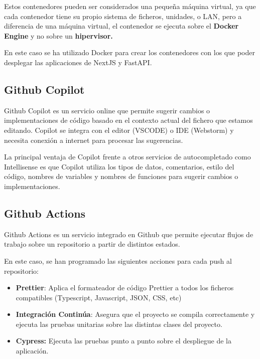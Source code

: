 Estos contenedores pueden ser considerados una pequeña máquina virtual,
ya que cada contenedor tiene su propio sistema de ficheros, unidades, o
LAN, pero a diferencia de una máquina virtual, el contenedor se ejecuta
sobre el \textbf{Docker Engine} y no sobre un \textbf{hipervisor.}

En este caso se ha utilizado Docker para crear los contenedores con los
que poder desplegar las aplicaciones de NextJS y FastAPI.

\hypertarget{github-copilot}{%
\subsection{Github Copilot}\label{github-copilot}}

Github Copilot es un servicio online que permite sugerir cambios o
implementaciones de código basado en el contexto actual del fichero que
estamos editando. Copilot se integra con el editor (VSCODE) o IDE
(Webstorm) y necesita conexión a internet para procesar las sugerencias.

La principal ventaja de Copilot frente a otros servicios de
autocompletado como Intellisense es que Copilot utiliza los tipos de
datos, comentarios, estilo del código, nombres de variables y nombres de
funciones para sugerir cambios o implementaciones.

\hypertarget{github-actions}{%
\subsection{Github Actions}\label{github-actions}}

Github Actions es un servicio integrado en Github que permite ejecutar
flujos de trabajo sobre un repositorio a partir de distintos estados.

En este caso, se han programado las siguientes acciones para cada push
al repositorio:

\begin{itemize}
\itemsep0em 
\item
  \textbf{Prettier}: Aplica el formateador de código Prettier a todos
  los ficheros compatibles (Typescript, Javascript, JSON, CSS, etc)
\item
  \textbf{Integración Continúa}: Asegura que el proyecto se compila
  correctamente y ejecuta las pruebas unitarias sobre las distintas
  clases del proyecto.
\item
  \textbf{Cypress:} Ejecuta las pruebas punto a punto sobre el
  despliegue de la aplicación.
\end{itemize}

